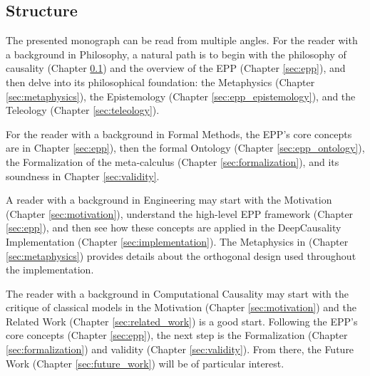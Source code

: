 \subsection{Structure}

The presented monograph can be read from multiple angles. For the reader with a background in Philosophy, a natural path is to begin with the philosophy of causality (Chapter \ref{}) and the overview of the EPP (Chapter \ref{sec:epp}), and then delve into its philosophical foundation: the Metaphysics (Chapter \ref{sec:metaphysics}), the Epistemology (Chapter \ref{sec:epp_epistemology}), and the Teleology (Chapter \ref{sec:teleology}).

For the reader with a background in Formal Methods, the EPP's core concepts are in Chapter \ref{sec:epp}), then the formal Ontology (Chapter \ref{sec:epp_ontology}), the Formalization of the meta-calculus (Chapter \ref{sec:formalization}), and its soundness in Chapter \ref{sec:validity}.

A reader with a background in Engineering may start with the Motivation (Chapter \ref{sec:motivation}), understand the high-level EPP framework (Chapter \ref{sec:epp}), and then see how these concepts are applied in the DeepCausality Implementation (Chapter \ref{sec:implementation}). The Metaphysics in (Chapter \ref{sec:metaphysics}) provides details about the orthogonal design used throughout the implementation.

The reader with a background in Computational Causality may start with the critique of classical models in the Motivation (Chapter \ref{sec:motivation}) and the Related Work (Chapter \ref{sec:related_work}) is a good start. Following the EPP's core concepts (Chapter \ref{sec:epp}), the next step is the Formalization (Chapter \ref{sec:formalization}) and validity (Chapter \ref{sec:validity}). From there, the Future Work (Chapter \ref{sec:future_work}) will be of particular interest.

\newpage
